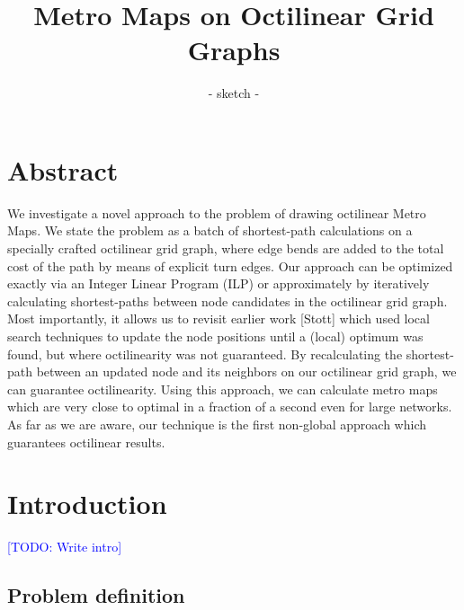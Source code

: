 \documentclass{sig-alternate-sigmod09}
\newcommand\TODO[1]{\textcolor{blue}{\small [TODO: #1]}}
\begin{document}
\title{Metro Maps on Octilinear Grid Graphs}
\subtitle{- sketch -}


\maketitle

\section{Abstract}

We investigate a novel approach to the problem of drawing octilinear Metro Maps.
We state the problem as a batch of shortest-path calculations on a specially crafted octilinear grid graph, where edge bends are added to the total cost of the path by means of explicit turn edges.
Our approach can be optimized exactly via an Integer Linear Program (ILP) or approximately by iteratively calculating shortest-paths between node candidates in the octilinear grid graph.
Most importantly, it allows us to revisit earlier work [Stott] which used local search techniques to update the node positions until a (local) optimum was found, but where octilinearity was not guaranteed.
By recalculating the shortest-path between an updated node and its neighbors on our octilinear grid graph, we can guarantee octilinearity.
Using this approach, we can calculate metro maps which are very close to optimal in a fraction of a second even for large networks.
As far as we are aware, our technique is the first non-global approach which guarantees octilinear results.

\section{Introduction}

\TODO{Write intro}

\subsection{Problem definition}
\end{document}
